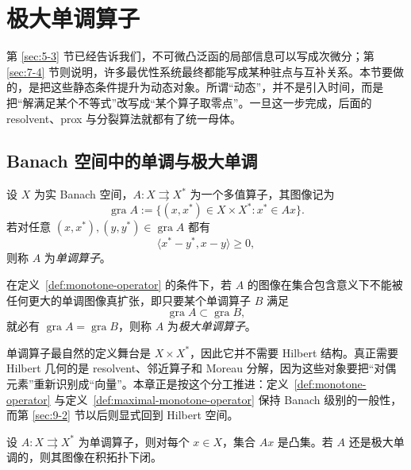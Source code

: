 \section{极大单调算子}

\label{sec:9-1}

第 \ref{sec:5-3} 节已经告诉我们，不可微凸泛函的局部信息可以写成次微分；第 \ref{sec:7-4} 节则说明，许多最优性系统最终都能写成某种驻点与互补关系。本节要做的，是把这些静态条件提升为动态对象。所谓“动态”，并不是引入时间，而是把“解满足某个不等式”改写成“某个算子取零点”。一旦这一步完成，后面的 resolvent、prox 与分裂算法就都有了统一母体。

\subsection{Banach 空间中的单调与极大单调}

\begin{definition}[单调算子]\label{def:monotone-operator}
设 $X$ 为实 Banach 空间，$A\colon X\rightrightarrows X^\ast$ 为一个多值算子，其图像记为
\[
\operatorname{gra} A:=\{(x,x^\ast)\in X\times X^\ast:x^\ast\in A x\}.
\]
若对任意 $(x,x^\ast),(y,y^\ast)\in \operatorname{gra} A$ 都有
\[
\langle x^\ast-y^\ast,x-y\rangle\ge 0,
\]
则称 $A$ 为\emph{单调算子}。
\end{definition}

\begin{definition}[极大单调算子]\label{def:maximal-monotone-operator}
在定义~\ref{def:monotone-operator} 的条件下，若 $A$ 的图像在集合包含意义下不能被任何更大的单调图像真扩张，即只要某个单调算子 $B$ 满足
\[
\operatorname{gra} A\subset \operatorname{gra} B,
\]
就必有 $\operatorname{gra} A=\operatorname{gra} B$，则称 $A$ 为\emph{极大单调算子}。
\end{definition}

\begin{remark}
单调算子最自然的定义舞台是 $X\times X^\ast$，因此它并不需要 Hilbert 结构。真正需要 Hilbert 几何的是 resolvent、邻近算子和 Moreau 分解，因为这些对象要把“对偶元素”重新识别成“向量”。本章正是按这个分工推进：定义~\ref{def:monotone-operator} 与定义~\ref{def:maximal-monotone-operator} 保持 Banach 级别的一般性，而第 \ref{sec:9-2} 节以后则显式回到 Hilbert 空间。
\end{remark}

\begin{proposition}[单调图像的基本结构]
设 $A\colon X\rightrightarrows X^\ast$ 为单调算子，则对每个 $x\in X$，集合 $A x$ 是凸集。若 $A$ 还是极大单调的，则其图像在积拓扑下闭。
\end{proposition}

